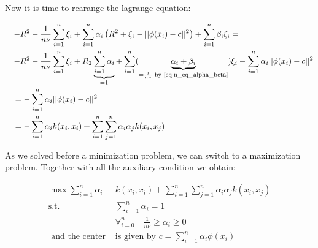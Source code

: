 Now it is time to rearange the lagrange equation:

\begin{align}
    \label{eq:}
    - R^2  & - \frac{1}{n \nu} \sum_{i=1}^n \xi_i
               + \sum_{i=1}^n \alpha_i \left( R^2 + \xi_i - ||\phi(x_i) - c||^2 \right)
            +  \sum_{i=1}^n \beta_i \xi_i = \\
    = - R^2  & - \frac{1}{n \nu} \sum_{i=1}^n \xi_i
               + R_2 \underbrace{\sum_{i=1}^n \alpha_i }_{= 1}
               + \sum_{i=1}^n ( \underbrace{\alpha_i + \beta_i}_{=\frac{1}{n\nu}
               \textrm{ by \eqref{eq:n_eq_alpha_beta}}} ) \xi_i
               - \sum_{i=1}^n \alpha_i ||\phi(x_i) - c||^2 \\
    = - & \sum_{i=1}^n \alpha_i ||\phi(x_i) - c||^2 \\
    = - & \sum_{i=1}^n \alpha_i k(x_i, x_i) +
    \sum_{i=1}^n \sum_{j=1}^n \alpha_i \alpha_j k(x_i, x_j)
\end{align}

As we solved before a minimization problem, we can switch to a maximization problem.
Together with all the auxiliary condition we obtain:

\begin{align}
    \label{eq:}
    \max  \sum_{i=1}^n \alpha_i & k(x_i, x_i) + \sum_{i=1}^n \sum_{j=1}^n \alpha_i \alpha_j k(x_i, x_j) \\
     \textrm{s.t. } & \sum_{i=1}^n \alpha_i = 1 \\
                    & \forall_{i=0}^n \quad \frac{1}{n \nu} \ge  \alpha_i \ge 0\\
     \textrm{ and the center }&\textrm{is given by } c = \sum_{i=1}^n \alpha_i \phi(x_i)
\end{align}
